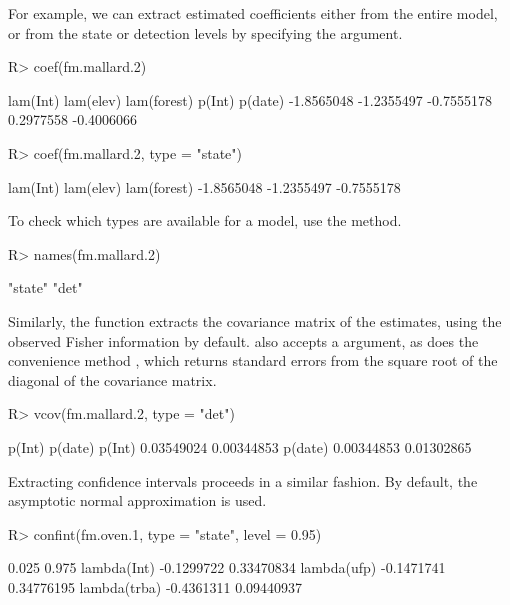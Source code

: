 \documentclass[article,shortnames]{jss}
\begin{document}
{For example, we can extract estimated coefficients either from the
entire model, or from the state or detection levels by specifying the
 argument.

\begin{Schunk}
\begin{Sinput}
R> coef(fm.mallard.2)
\end{Sinput}
\begin{Soutput}
   lam(Int)   lam(elev) lam(forest)      p(Int)     p(date) 
 -1.8565048  -1.2355497  -0.7555178   0.2977558  -0.4006066 
\end{Soutput}
\begin{Sinput}
R> coef(fm.mallard.2, type = "state")
\end{Sinput}
\begin{Soutput}
   lam(Int)   lam(elev) lam(forest) 
 -1.8565048  -1.2355497  -0.7555178 
\end{Soutput}
\end{Schunk}

To check which types are available for a model, use the  method.

\begin{Schunk}
\begin{Sinput}
R> names(fm.mallard.2)
\end{Sinput}
\begin{Soutput}
[1] "state" "det"  
\end{Soutput}
\end{Schunk}

Similarly, the  function extracts the covariance matrix of
the estimates, using the observed Fisher information by default. 
also accepts a  argument, as does the convenience method
, which returns standard errors from the square root of the diagonal
of the covariance matrix.

\begin{Schunk}
\begin{Sinput}
R> vcov(fm.mallard.2, type = "det")
\end{Sinput}
\begin{Soutput}
            p(Int)    p(date)
p(Int)  0.03549024 0.00344853
p(date) 0.00344853 0.01302865
\end{Soutput}
\end{Schunk}

Extracting confidence intervals proceeds in a similar
fashion.  By default, the asymptotic normal approximation is used.

\begin{Schunk}
\begin{Sinput}
R> confint(fm.oven.1, type = "state", level = 0.95)
\end{Sinput}
\begin{Soutput}
                  0.025      0.975
lambda(Int)  -0.1299722 0.33470834
lambda(ufp)  -0.1471741 0.34776195
lambda(trba) -0.4361311 0.09440937
\end{Soutput}
\end{Schunk}

}
\end{document}
